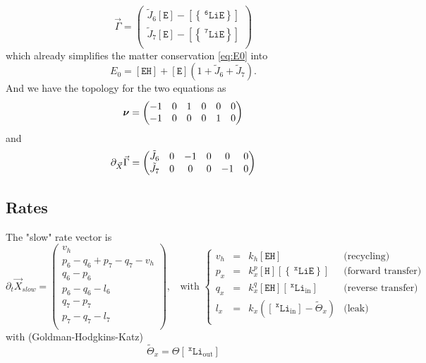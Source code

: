 \documentclass[aps,onecolumn,10pt]{revtex4}
\newcommand{\mychem}[1]{\mathtt{#1}}
\newcommand{\myconc}[1]{\left\lbrack{#1}\right\rbrack}
\newcommand{\spLi}[1]{{~^{\mychem{#1}}\mychem{Li}}}
\newcommand{\spEout}{\mychem{E}}
\newcommand{\Eout}{\myconc{\spEout}}
\newcommand{\spLiE}[1]{\left\lbrace\spLi{#1}\spEout\right\rbrace}
\newcommand{\LiE}[1]{\myconc{\spLiE{#1}}}
\newcommand{\spLiIn}[1]{{\spLi{#1}}_{\mathrm{in}}}
\newcommand{\LiIn}[1]{\myconc{\spLiIn{#1}}}
\newcommand{\spLiOut}[1]{{\spLi{#1}}_{\mathrm{out}}}
\newcommand{\LiOut}[1]{\myconc{\spLiOut{#1}}}
\newcommand{\spEHin}{\mychem{EH}}
\newcommand{\EHin}{\myconc{\spEHin}}
\newcommand{\spproton}{\mychem{H}}
\newcommand{\proton}{\myconc{\spproton}}
\newcommand{\mymat}[1]{{\bm{#1}}}
\begin{document}
\begin{equation}
\vec{\Gamma} = 
\begin{pmatrix}
	\tilde{J}_6 \Eout - \LiE{6} \\
	\tilde{J}_7 \Eout - \LiE{7} \\
\end{pmatrix}
\end{equation}
which already simplifies the matter conservation \eqref{eq:E0} into
\begin{equation}
	E_0 = \EHin + \Eout \left(1+\tilde{J}_6+\tilde{J}_7\right).
\end{equation}
And we have the topology for the two equations as
\begin{equation}
	\label{eq:Nu}
	\mymat{\nu}=\begin{pmatrix}-1 & 0 & 1 & 0 & 0 & 0\cr -1 & 0 & 0 & 0 & 1 & 0\end{pmatrix}
\end{equation}
and
\begin{equation}
	\partial_{\vec{X}}\vec{\Gamma} = 
	\begin{pmatrix}\tilde{J}_6 & 0 & -1 & 0 & 0 & 0\cr\tilde{J}_7 & 0 & 0 & 0 & -1 & 0\end{pmatrix}
\end{equation}

\subsection{Rates}

The "slow" rate vector is
\begin{equation}
	\partial_t\vec{X}_{slow} = 
	\begin{pmatrix}
		v_h\\
		p_6-q_6+p_7-q_7-v_h\\
		q_6-p_6\\
		p_6-q_6-l_6\\
		q_7-p_7\\
		p_7-q_7-l_7\\
	\end{pmatrix}
	,\;\;\text{ with }
	\left\lbrace
	\begin{array}{rcll}
	v_h & = & k_h \EHin & \text{(recycling)}\\
	p_x & = & k_x^p \proton \LiE{x} & \text{(forward transfer)}\\
	q_x & = & k_x^q \EHin \LiIn{x} & \text{(reverse transfer)} \\
	l_x & = & k_x  \left(\LiIn{x}-\tilde{\Theta}_x\right) & \text{(leak)}\\
	\end{array}
	\right.
\end{equation}
with (Goldman-Hodgkins-Katz)
\begin{equation}
	\tilde{\Theta}_x = \Theta \LiOut{x}
\end{equation}
\end{document}
